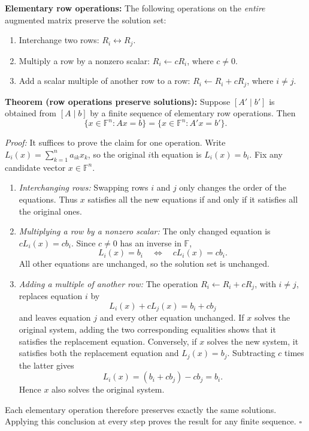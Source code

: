 \documentclass[a4paper,11pt,abstract=true]{scrartcl}
\theoremstyle{dotlessP}
\theoremstyle{dotlessS}
\theoremstyle{remark}
\theoremstyle{definition}
\begin{document}
\begin{claim_box}
\textbf{Elementary row operations:} The following operations on
the \emph{entire} augmented matrix preserve the solution set:
\begin{enumerate}
    \item Interchange two rows: $R_i\leftrightarrow R_j$.
    \item Multiply a row by a nonzero scalar:
    $R_i\leftarrow cR_i$, where $c\neq0$.
    \item Add a scalar multiple of another row to a row:
    $R_i\leftarrow R_i+cR_j$, where $i\neq j$.
\end{enumerate}
\end{claim_box}

\begin{claim_box}
\textbf{Theorem (row operations preserve solutions):} Suppose
$[A'\mid b']$ is obtained from $[A\mid b]$ by a finite sequence of
elementary row operations. Then
\[
\{x\in\mathbb{F}^n:Ax=b\}
=\{x\in\mathbb{F}^n:A'x=b'\}.
\]

\textit{Proof:} It suffices to prove the claim for one operation.
Write $L_i(x)=\sum_{k=1}^n a_{ik}x_k$, so the original $i$th
equation is $L_i(x)=b_i$. Fix any candidate vector $x\in\mathbb{F}^n$.
\begin{enumerate}
    \item \emph{Interchanging rows:} Swapping rows $i$ and $j$ only
    changes the order of the equations. Thus $x$ satisfies all the
    new equations if and only if it satisfies all the original ones.
    \item \emph{Multiplying a row by a nonzero scalar:} The only
    changed equation is $cL_i(x)=cb_i$. Since $c\neq0$ has an inverse
    in $\mathbb{F}$,
    \[
    L_i(x)=b_i\quad\Longleftrightarrow\quad cL_i(x)=cb_i.
    \]
    All other equations are unchanged, so the solution set is unchanged.
    \item \emph{Adding a multiple of another row:} The operation
    $R_i\leftarrow R_i+cR_j$, with $i\neq j$, replaces equation $i$ by
    \[
    L_i(x)+cL_j(x)=b_i+cb_j
    \]
    and leaves equation $j$ and every other equation unchanged.
    If $x$ solves the original system, adding the two corresponding
    equalities shows that it satisfies the replacement equation.
    Conversely, if $x$ solves the new system, it satisfies both the
    replacement equation and $L_j(x)=b_j$. Subtracting $c$ times the
    latter gives
    \[
    L_i(x)=(b_i+cb_j)-cb_j=b_i.
    \]
    Hence $x$ also solves the original system.
\end{enumerate}
Each elementary operation therefore preserves exactly the same
solutions. Applying this conclusion at every step proves the result
for any finite sequence. \hfill$\square$
\end{claim_box}
\end{document}
